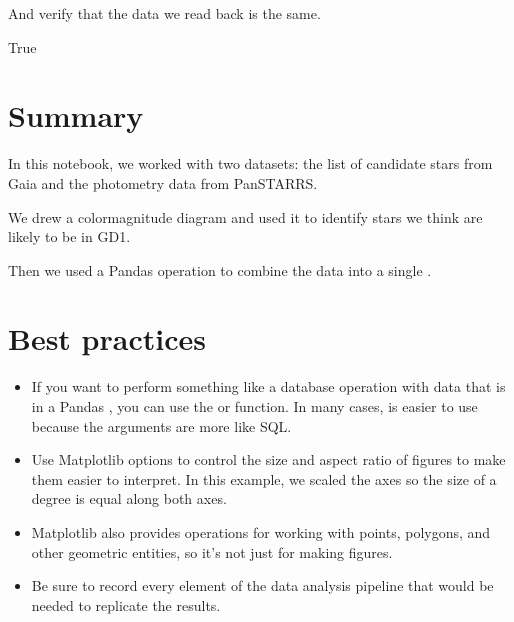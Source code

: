 \documentclass[letterpaper,10pt,english]{sphinxmanual}
\begin{document}
And verify that the data we read back is the same.

\begin{sphinxVerbatim}[commandchars=\\\{\}]
  
\end{sphinxVerbatim}

\begin{sphinxVerbatim}[commandchars=\\\{\}]
True
\end{sphinxVerbatim}


\section{Summary}
\label{\detokenize{06_photo:summary}}
In this notebook, we worked with two datasets: the list of candidate stars from Gaia and the photometry data from Pan\sphinxhyphen{}STARRS.

We drew a color\sphinxhyphen{}magnitude diagram and used it to identify stars we think are likely to be in GD\sphinxhyphen{}1.

Then we used a Pandas  operation to combine the data into a single .


\section{Best practices}
\label{\detokenize{06_photo:best-practices}}\begin{itemize}
\item {} 
If you want to perform something like a database  operation with data that is in a Pandas , you can use the  or  function.  In many cases,  is easier to use because the arguments are more like SQL.

\item {} 
Use Matplotlib options to control the size and aspect ratio of figures to make them easier to interpret.  In this example, we scaled the axes so the size of a degree is equal along both axes.

\item {} 
Matplotlib also provides operations for working with points, polygons, and other geometric entities, so it’s not just for making figures.

\item {} 
Be sure to record every element of the data analysis pipeline that would be needed to replicate the results.

\end{itemize}
\end{document}
